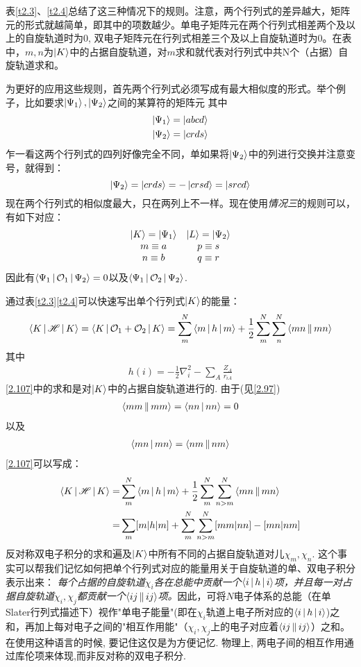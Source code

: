表\ref{t2.3}、\ref{t2.4}总结了这三种情况下的规则。注意，两个行列式的差异越大，矩阵元的形式就越简单，即其中的项数越少。单电子矩阵元在两个行列式相差两个及以上的自旋轨道时为0, 双电子矩阵元在行列式相差三个及以上自旋轨道时为0。在表中，$m,n$为$\Ket{K}$中的占据自旋轨道，对$m$求和就代表对行列式中共N个（占据）自旋轨道求和。

为更好的应用这些规则，首先两个行列式必须写成有最大相似度的形式。举个例子，比如要求$\Ket{\Psi_1},\Ket{\Psi_2}$之间的某算符的矩阵元
其中
\begin{align}
\Ket{\Psi_1}=\Ket{abcd}\notag\\
\Ket{\Psi_2}=\Ket{crds}\notag
\end{align}
乍一看这两个行列式的四列好像完全不同，单如果将$\Ket{\Psi_2}$中的列进行交换并注意变号，就得到：
\begin{equation*}
\Ket{\Psi_2}=\Ket{crds}=-\Ket{crsd}=\Ket{srcd}
\end{equation*}
现在两个行列式的相似度最大，只在两列上不一样。现在使用{\textit{情况三}}的规则可以，有如下对应：
\[\begin{array}{cc}
\Ket{K}=\Ket{\Psi_1}&\Ket{L}=\Ket{\Psi_2}\\
m\equiv a & p\equiv s\\
n\equiv b &q\equiv r
\end{array}\]
因此有$\Braket{\Psi_1|\mathcal{O}_1|\Psi_2}=0$以及$\Braket{\Psi_1|\mathcal{O}_2|\Psi_2}$.

通过表\ref{t2.3}\ref{t2.4}可以快速写出单个行列式$\Ket{K}$的能量：
\begin{align}
\label{2.107}
\Braket{K|\mathscr{H}|K}=\Braket{K|\mathcal{O}_1+\mathcal{O}_2|K}=\sum_m^N\Braket{m|h|m}+\frac{1}{2}\sum_m^N\sum_n^N\Braket{mn||mn}
\end{align}
其中
\begin{align}
\label{2.108}
h(i)=-\frac{1}{2}\nabla_i^2-\sum_A\frac{Z_A}{r_{iA}}
\end{align}
\ref{2.107}中的求和是对$\Ket{K}$中的占据自旋轨道进行的. 由于(见\ref{2.97})
\begin{align}
\Braket{mm||mm}=\Braket{nn|nn}=0
\end{align}
以及
\begin{align}
\Braket{mn|mn}=\Braket{nm||nm}
\end{align}
\ref{2.107}可以写成：
\begin{align}
\Braket{K|\mathscr{H}|K}=&\sum_m^N\Braket{m|h|m}+\frac{1}{2}\sum_m^N\sum_{n>m}^N\Braket{mn||mn}\\
=&\sum_m[m|h|m]+\sum_m^N\sum_{n>m}^N[mm|nn]-[mn|nm]
\end{align}
反对称双电子积分的求和遍及$\Ket{K}$中所有不同的占据自旋轨道对儿$\chi_m,\chi_n$. 这个事实可以帮我们记忆如何把单个行列式对应的能量用关于自旋轨道的单、双电子积分表示出来：\textit{ 每个占据的自旋轨道$\chi_i$各在总能中贡献一个$\Braket{i|h|i}$项，并且每一对占据自旋轨道$\chi_i,\chi_j$都贡献一个$\Braket{ij||ij}$项。}因此，可将$N$电子体系的总能（在单Slater行列式描述下）视作"单电子能量"(即在$\chi_i$轨道上电子所对应的$\Braket{i|h|i}$)之和，再加上每对电子之间的"相互作用能"（$\chi_i,\chi_j$上的电子对应着$\Braket{ij||ij}$）之和。在使用这种语言的时候, 要记住这仅是为方便记忆. 物理上, 两电子间的相互作用通过库伦项来体现,而非反对称的双电子积分.

